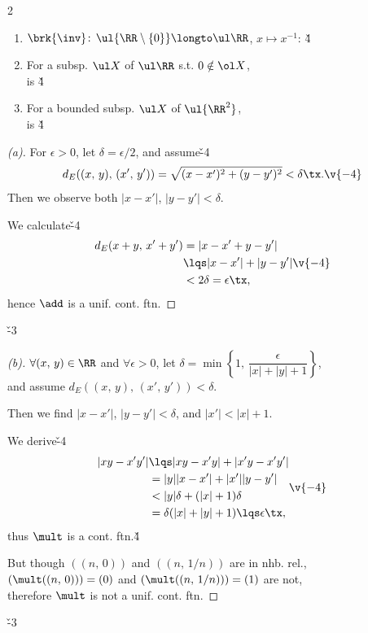 \documentclass[dvipdfmx,a4paper,titlepage,9pt]{jsarticle}
\begin{document}
\begin{multicols*}{2}
\begin{enumerate}[label=(\alph*)]
\item$\brk{\inv}\!:\,\ul{\RR\setminus\{0\}}\longto\ul\RR$, $x\longmapsto x^{-1}$: \v4

\item For a subsp. $\ul X$ of $\ul\RR$ s.t. $0\notin\ol X$,\\
 is \v4

\item For a bounded subsp. $\ul X$ of $\ul{\RR^2}$,\\
 is \v4
\end{enumerate}

\begin{pfbox}
\begin{proof}[(a)]
For $\epsilon>0$, let $\delta=\epsilon/2$, and assume\v{-4}
$$d_E((x,\,y),\,(x',\,y'))=\sqrt{(x-x')^2+(y-y')^2}<\delta\tx.\v{-4}$$
Then we observe both $|x-x'|$, $|y-y'|<\delta$.

We calculate\v{-4}
$$\begin{aligned}
d_E(x+y,\,x'+y')&=|x-x'+y-y'|\\
&\lqs|x-x'|+|y-y'|\\
&<2\delta=\epsilon\tx,
\end{aligned}\v{-4}$$
hence $\add$ is a unif. cont. ftn.
\end{proof}\v{-3}

\dotfill

\begin{proof}[(b)]
$\forall(x,\,y)\in\RR$ and $\forall\epsilon>0$, let $\delta=\min\left\{1,\,\dfrac\epsilon{|x|+|y|+1}\right\}$,\\
and assume $d_E((x,\,y),\,(x',\,y'))<\delta$.

Then we find $|x-x'|$, $|y-y'|<\delta$, and $|x'|<|x|+1$.

We derive\v{-4}
$$\begin{aligned}
|xy-x'y'|&\lqs|xy-x'y|+|x'y-x'y'|\\
&=|y||x-x'|+|x'||y-y'|\\
&<|y|\delta+(|x|+1)\delta\\
&=\delta(|x|+|y|+1)\lqs\epsilon\tx,
\end{aligned}\v{-4}$$
thus $\mult$ is a cont. ftn.\v4

But though $((n,\,0))$ and $((n,\,1/n))$ are in nhb. rel.,\\
$(\mult((n,\,0)))=(0)$ and $(\mult((n,\,1/n)))=(1)$ are not,\\
therefore $\mult$ is not a unif. cont. ftn.
\end{proof}\v{-3}


\end{pfbox}
\end{multicols*}
\end{document}
